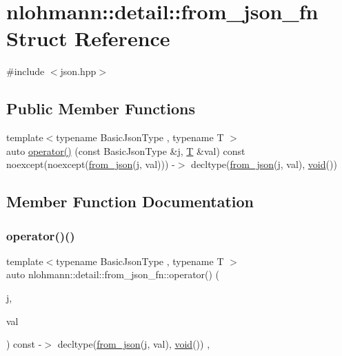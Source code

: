 \hypertarget{structnlohmann_1_1detail_1_1from__json__fn}{}\section{nlohmann\+::detail\+::from\+\_\+json\+\_\+fn Struct Reference}
\label{structnlohmann_1_1detail_1_1from__json__fn}


{\ttfamily \#include $<$json.\+hpp$>$}

\subsection*{Public Member Functions}
\begin{DoxyCompactItemize}
\item 
{\footnotesize template$<$typename Basic\+Json\+Type , typename T $>$ }\\auto \mbox{\hyperlink{structnlohmann_1_1detail_1_1from__json__fn_a6d14a74e1043072c77892534572d2973}{operator()}} (const Basic\+Json\+Type \&j, \mbox{\hyperlink{_keyboard_event_8h_adf1f3edb9115acb0a1e04209b7a9937b}{T}} \&val) const noexcept(noexcept(\mbox{\hyperlink{namespacenlohmann_1_1detail_a1f0395aad0fe853a4539288749d3a603}{from\+\_\+json}}(j, val))) -\/$>$ decltype(\mbox{\hyperlink{namespacenlohmann_1_1detail_a1f0395aad0fe853a4539288749d3a603}{from\+\_\+json}}(j, val), \mbox{\hyperlink{namespacenlohmann_1_1detail_a59fca69799f6b9e366710cb9043aa77d}{void}}())
\end{DoxyCompactItemize}


\subsection{Member Function Documentation}
\mbox{\label{structnlohmann_1_1detail_1_1from__json__fn_a6d14a74e1043072c77892534572d2973}} 
\subsubsection{\texorpdfstring{operator()()}{operator()()}}
{\footnotesize\ttfamily template$<$typename Basic\+Json\+Type , typename T $>$ \\
auto nlohmann\+::detail\+::from\+\_\+json\+\_\+fn\+::operator() (\begin{DoxyParamCaption}\item[{const Basic\+Json\+Type \&}]{j,  }\item[{\mbox{\hyperlink{_keyboard_event_8h_adf1f3edb9115acb0a1e04209b7a9937b}{T}} \&}]{val }\end{DoxyParamCaption}) const -\/$>$ decltype(\mbox{\hyperlink{namespacenlohmann_1_1detail_a1f0395aad0fe853a4539288749d3a603}{from\+\_\+json}}(j, val), \mbox{\hyperlink{namespacenlohmann_1_1detail_a59fca69799f6b9e366710cb9043aa77d}{void}}())
    \hspace{0.3cm}{\ttfamily [inline]}, {\ttfamily [noexcept]}}




